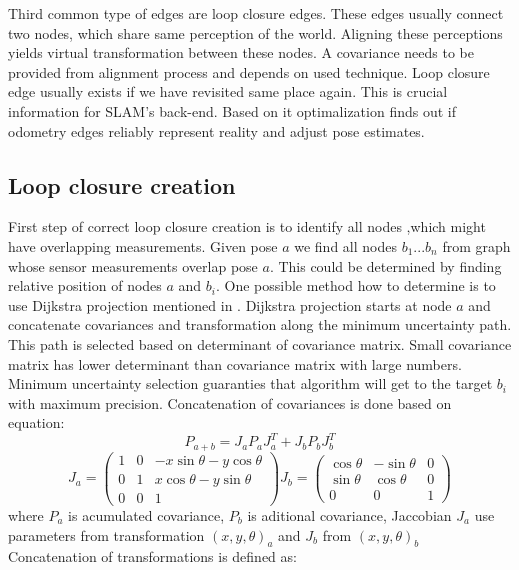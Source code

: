    
Third common type of edges are loop closure edges. These edges usually connect two nodes, which share same perception of the world. Aligning these perceptions yields virtual transformation between these nodes. A covariance needs to be provided from alignment process and depends on used technique. Loop closure edge usually exists if we have revisited same place again. This is crucial information for \gls{SLAM}'s back-end. Based on it optimalization finds out if odometry edges reliably represent reality and adjust pose estimates.

\subsection {Loop closure creation}
First step of correct loop closure creation is to identify all nodes ,which might have overlapping measurements. Given pose $a$ we find all nodes $b_{1} ... b_{n}$ from graph whose sensor measurements overlap pose $a$. This could be determined by finding relative position of nodes $a$ and $b_{i}$. One possible method how to determine is to use Dijkstra projection mentioned in \cite{Olson2009Loop}. Dijkstra projection starts at node $a$ and concatenate covariances and transformation along the minimum uncertainty path. This path is selected based on determinant of covariance matrix. Small covariance matrix has lower determinant than covariance matrix with large numbers. Minimum uncertainty selection guaranties that algorithm will get to the target $b_{i}$ with maximum precision. Concatenation of covariances is done based on equation:
\begin{equation}
P_{a+b} = J_{a} P_{a} J_{a}^{T} + J_{b} P_{b} J_{b}^{T}
\end{equation}   
\begin{equation}
J_{a} = 
\begin{pmatrix}
1 & 0 & -x\sin\theta -y\cos\theta  \\
0 & 1 & x\cos \theta  - y\sin\theta  \\
0 & 0 & 1
\end{pmatrix} 
J_{b} = 
\begin{pmatrix}
\cos\theta & -\sin\theta & 0  \\
\sin\theta & \cos\theta & 0\\
0 & 0 & 1
\end{pmatrix} 
\end{equation} 
where $P_{a}$ is acumulated covariance, $P_{b}$ is aditional covariance, Jaccobian $J_{a}$ use parameters from transformation $(x,y,\theta)_{a}$ and $J_{b}$ from  $(x,y,\theta)_{b}$ Concatenation of transformations is defined as:
